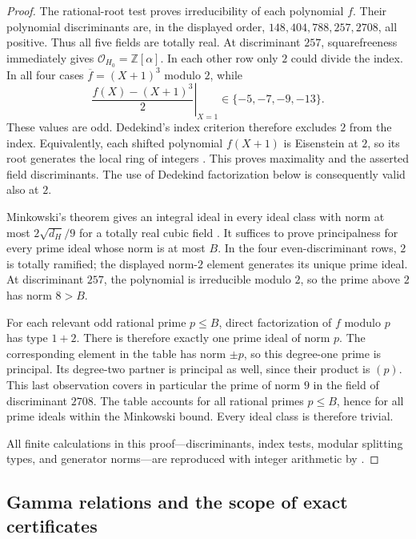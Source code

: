 \documentclass[11pt,a4paper]{article}
\theoremstyle{definition}
\theoremstyle{remark}
\numberwithin{equation}{section}
\begin{document}
\begin{proof}
The rational-root test proves irreducibility of each polynomial $f$.
Their polynomial discriminants are, in the displayed order,
$148,404,788,257,2708$, all positive.  Thus all five fields are
totally real.  At discriminant $257$, squarefreeness immediately gives
$\mathcal O_{H_0}=\mathbb Z[\alpha]$.  In each other row only $2$
could divide the index.  In all four cases
$\overline f=(X+1)^3$ modulo $2$, while
\[
 \left.\frac{f(X)-(X+1)^3}{2}\right|_{X=1}
                  \in\{-5,-7,-9,-13\}.
\]
These values are odd.  Dedekind's index criterion therefore excludes
$2$ from the index.  Equivalently, each shifted polynomial $f(X+1)$
is Eisenstein at $2$, so its root generates the local ring of integers
\cite[Proposition~7.55 and Remark~7.56]{MilneANT}.  This proves
maximality and the asserted field discriminants.  The use of Dedekind factorization below is consequently
valid also at $2$.

Minkowski's theorem gives an integral ideal in every ideal class
with norm at most $2\sqrt{d_H}/9$ for a totally real cubic field
\cite{MilneANT}.  It suffices to prove principalness for every prime
ideal whose norm is at most $B$.  In the four even-discriminant rows,
$2$ is totally ramified; the displayed norm-$2$ element generates its
unique prime ideal.  At discriminant $257$, the polynomial is
irreducible modulo $2$, so the prime above $2$ has norm $8>B$.

For each relevant odd rational prime $p\leq B$, direct factorization
of $f$ modulo $p$ has type $1+2$.  There is therefore exactly one
prime ideal of norm $p$.  The corresponding element in the table
has norm $\pm p$, so this degree-one prime is principal.  Its
degree-two partner is principal as well, since their product is
$(p)$.  This last observation covers in particular the prime of
norm $9$ in the field of discriminant $2708$.  The table accounts
for all rational primes $p\leq B$, hence for all prime ideals within
the Minkowski bound.  Every ideal class is therefore trivial.

All finite calculations in this proof---discriminants, index tests,
modular splitting types, and generator norms---are reproduced with
integer arithmetic by .
\end{proof}

\subsection{Gamma relations and the scope of exact certificates}
\label{corr:gamma-certificates}
\end{document}
